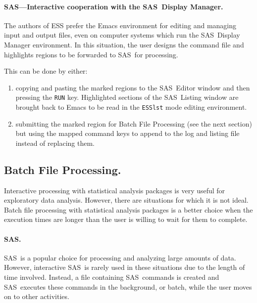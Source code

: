 \documentclass{article}
\newcommand*{\SAS}{\textsc{SAS}}
\newcommand{\stexttt}[1]{{\small\texttt{#1}}}
\begin{document}
\paragraph{\SAS---Interactive cooperation with the \SAS\ Display Manager.}

The authors of ESS prefer the Emacs environment for editing and
managing input and output files, even on computer systems which run
the \SAS\ Display Manager environment.  In this situation, the user
designs the command file and highlights regions to be forwarded to
\SAS\ for processing.

This can be done by either:
\begin{enumerate}
\item copying and pasting the marked regions to the \SAS\ Editor window
  and then pressing the \stexttt{RUN} key.  Highlighted sections of
  the \SAS\ Listing window are brought back to Emacs to be read in the
  \stexttt{ESSlst} mode editing environment.
\item submitting the marked region for Batch File Processing (see the
  next section) but using the mapped command keys to append to the log
  and listing file instead of replacing them.
\end{enumerate}

\subsection{Batch File Processing.}
\label{sec:batch-file}

Interactive processing with statistical analysis packages is very useful
for exploratory data analysis. %
However, there are %
situations for which it is not ideal.  Batch file processing with
statistical analysis packages is a better choice when the execution times 
are longer than the user is willing to wait for them to complete.

\paragraph{\SAS.}
\label{sec:sas-batch}

\SAS\ is a popular choice for processing and analyzing large amounts
of data.  However, interactive \SAS\ is rarely used in these situations
due to the length of time involved.  Instead, a file containing \SAS\ 
commands is created and \SAS\ executes these commands in the background, 
or batch, while the user moves on to other activities.
\end{document}
